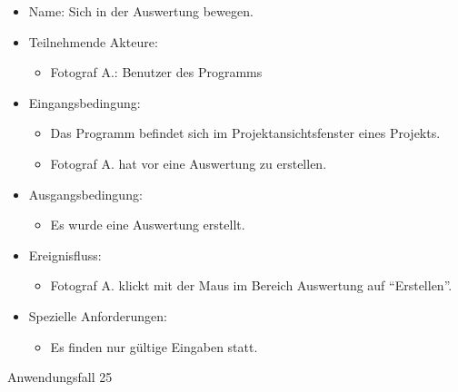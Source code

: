 	\begin{itemize}
		\item Name: Sich in der Auswertung bewegen.
		\item Teilnehmende Akteure:
		\begin{itemize}
			\item	Fotograf A.: Benutzer des Programms		
		\end{itemize}
		\item Eingangsbedingung:
		\begin{itemize}
			\item	Das Programm befindet sich im Projektansichtsfenster eines Projekts.
			\item Fotograf A. hat vor eine Auswertung zu erstellen.
		\end{itemize}
		\item Ausgangsbedingung:
		\begin{itemize}
			\item	Es wurde eine Auswertung erstellt.	
		\end{itemize}
		\item Ereignisfluss:
		\begin{itemize}
			\item Fotograf A. klickt mit der Maus im Bereich Auswertung auf "`Erstellen"'.
		\end{itemize}
		\item Spezielle Anforderungen:
		\begin{itemize}
			\item	Es finden nur gültige Eingaben statt.			
		\end{itemize}			
	\end{itemize}
	
	\begin{description}
		\item[Anwendungsfall 25]
	\end{description}
	
